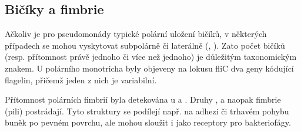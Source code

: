 \subsection{Bičíky a fimbrie}
Ačkoliv je pro pseudomonády typické polární uložení bičíků, v některých případech se mohou vyskytovat subpolárně či laterálně (, ).
Zato počet bičíků (resp. přítomnost právě jednoho či více než jednoho) je důležitým taxonomickým znakem.
U polárního monotricha  byly objeveny na lokusu fliC dva geny kódující flagelin, přičemž jeden z nich je variabilní. \cite{spangenberg1996genetic}

Přítomnost polárních fimbrií byla detekována u  a .
Druhy ,  a  naopak fimbrie (pili) postrádají.
Tyto struktury se podílejí např. na adhezi či trhavém pohybu buněk po pevném povrchu, ale mohou sloužit i jako receptory pro bakteriofágy. \cite{garrity2005bergey}



\cleardoublepage

